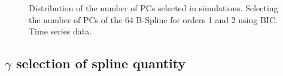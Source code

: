 \documentclass[
]{article}
\begin{document}
\begin{figure}

\begin{minipage}[t]{0.50\linewidth}

{\centering 


}

\end{minipage}%
%
\begin{minipage}[t]{0.50\linewidth}

{\centering 


}

\end{minipage}%

\caption{\label{fig-pc-ts}Distribution of the number of PCs selected in
simulations. Selecting the number of PCs of the 64 B-Spline for orders 1
and 2 using BIC. Time series data.}

\end{figure}

\hypertarget{gamma-selection-of-spline-quantity}{%
\subsection{\texorpdfstring{\(\gamma\) selection of spline
quantity}{\textbackslash gamma selection of spline quantity}}\label{gamma-selection-of-spline-quantity}}
\end{document}
